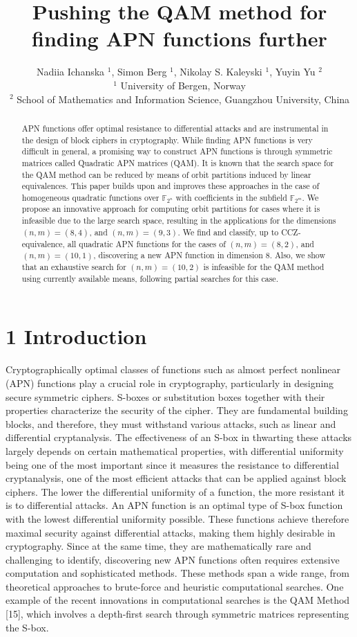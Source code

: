 \documentclass[10pt]{article}
\title{Pushing the QAM method for finding APN functions further }
\author{Nadiia Ichanska ${ }^{1}$, Simon Berg ${ }^{1}$, Nikolay S. Kaleyski ${ }^{1}$, Yuyin Yu ${ }^{2}$\\
${ }^{1}$ University of Bergen, Norway\\
${ }^{2}$ School of Mathematics and Information Science, Guangzhou University, China}
\date{}
\begin{document}
\maketitle
\captionsetup{singlelinecheck=false}


\begin{abstract}
APN functions offer optimal resistance to differential attacks and are instrumental in the design of block ciphers in cryptography. While finding APN functions is very difficult in general, a promising way to construct APN functions is through symmetric matrices called Quadratic APN matrices (QAM). It is known that the search space for the QAM method can be reduced by means of orbit partitions induced by linear equivalences. This paper builds upon and improves these approaches in the case of homogeneous quadratic functions over $\mathbb{F}_{2^{n}}$ with coefficients in the subfield $\mathbb{F}_{2^{m}}$. We propose an innovative approach for computing orbit partitions for cases where it is infeasible due to the large search space, resulting in the applications for the dimensions $(n, m)=(8,4)$, and $(n, m)=(9,3)$. We find and classify, up to CCZ-equivalence, all quadratic APN functions for the cases of $(n, m)=(8,2)$, and $(n, m)=(10,1)$, discovering a new APN function in dimension 8. Also, we show that an exhaustive search for $(n, m)=(10,2)$ is infeasible for the QAM method using currently available means, following partial searches for this case.
\end{abstract}

\section*{1 Introduction}
Cryptographically optimal classes of functions such as almost perfect nonlinear (APN) functions play a crucial role in cryptography, particularly in designing secure symmetric ciphers. S-boxes or substitution boxes together with their properties characterize the security of the cipher. They are fundamental building blocks, and therefore, they must withstand various attacks, such as linear and differential cryptanalysis. The effectiveness of an S-box in thwarting these attacks largely depends on certain mathematical properties, with differential uniformity being one of the most important since it measures the resistance to differential cryptanalysis, one of the most efficient attacks that can be applied against block ciphers. The lower the differential uniformity of a function, the more resistant it is to differential attacks. An APN function is an optimal type of S-box function with the lowest differential uniformity possible. These functions achieve therefore maximal security against differential attacks, making them highly desirable in cryptography. Since at the same time, they are mathematically rare and challenging to identify, discovering new APN functions often requires extensive computation and sophisticated methods. These methods span a wide range, from theoretical approaches to brute-force and heuristic computational searches. One example of the recent innovations in computational searches is the QAM Method [15], which involves a depth-first search through symmetric matrices representing the S-box.
\end{document}

